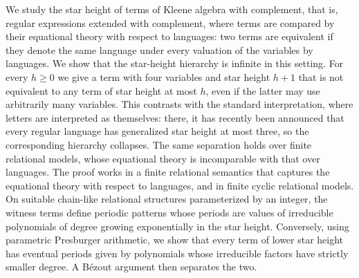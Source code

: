 We study the star height of terms of Kleene algebra with complement, that is, regular expressions extended with complement, where terms are compared by their equational theory with respect to languages: two terms are equivalent if they denote the same language under every valuation of the variables by languages.
We show that the star-height hierarchy is infinite in this setting.
For every $h \ge 0$ we give a term with four variables and star height $h+1$ that is not equivalent to any term of star height at most $h$, even if the latter may use arbitrarily many variables.
This contrasts with the standard interpretation, where letters are interpreted as themselves: there, it has recently been announced that every regular language has generalized star height at most three, so the corresponding hierarchy collapses.
The same separation holds over finite relational models, whose equational theory is incomparable with that over languages.
The proof works in a finite relational semantics that captures the equational theory with respect to languages, and in finite cyclic relational models.
On suitable chain-like relational structures parameterized by an integer, the witness terms define periodic patterns whose periods are values of irreducible polynomials of degree growing exponentially in the star height.
Conversely, using parametric Presburger arithmetic, we show that every term of lower star height has eventual periods given by polynomials whose irreducible factors have strictly smaller degree.
A B\'{e}zout argument then separates the two.
